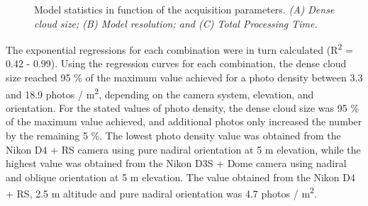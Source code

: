 \begin{figure}[ht]
	\caption[Model statistics in function of the acquisition parameters.]{Model statistics in function of the acquisition parameters. \textit{(A) Dense cloud size; (B) Model resolution; and (C) Total Processing Time.}}
	\label{figure1.4}
	
\end{figure}

The exponential regressions for each combination were in turn calculated (R\textsuperscript{2} = 0.42 - 0.99). Using the regression curves for each combination, the dense cloud size reached 95 \% of the maximum value achieved for a photo density between 3.3 and 18.9 photos / m\textsuperscript{2}, depending on the camera system, elevation, and orientation. For the stated values of photo density, the dense cloud size was 95 \% of the maximum value achieved, and additional photos only increased the number by the remaining 5 \%. The lowest photo density value was obtained from the Nikon D4 + RS camera using pure nadiral orientation at 5 m elevation, while the highest value was obtained from the Nikon D3S + Dome camera using nadiral and oblique orientation at 5 m elevation. The value obtained from the Nikon D4 + RS, 2.5 m altitude and pure nadiral orientation was 4.7 photos / m\textsuperscript{2}.

